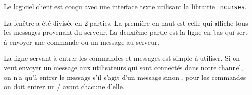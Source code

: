 \documentclass[12pt,french]{article}
\begin{document}










            Le logiciel client est conçu avec une interface texte utilisant la librairie {\tt
            ncurses}. 
            
            La fenêtre a été divisée en 2 parties. La première en haut est celle qui affiche tous les messages provenant du serveur.
            La deuxième partie est la ligne en bas qui sert à envoyer une commande ou un message au serveur.

            La ligne servant à entrer les commandes et messages est simple à utiliser. Si on veut envoyer un message 
            aux utilisateurs qui sont connectés dans notre channel, on n'a qu'à entrer le message s'il s'agit d'un message sinon
            , pour les commandes on doit entrer un / avant chacune d'elle.
\end{document}
